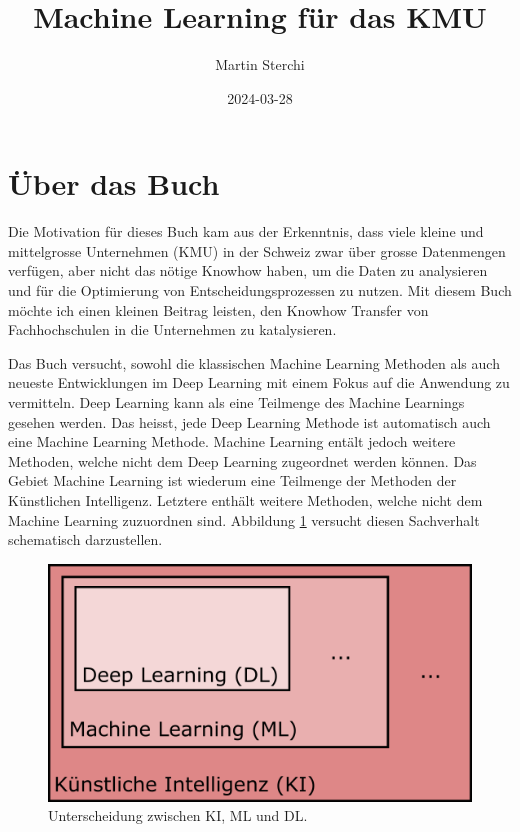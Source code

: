 \documentclass[
]{book}
\title{Machine Learning für das KMU}
\author{Martin Sterchi}
\date{2024-03-28}
\begin{document}
\maketitle

{
\setcounter{tocdepth}{1}
\tableofcontents
}
\hypertarget{uxfcber-das-buch}{%
\chapter*{Über das Buch}\label{uxfcber-das-buch}}

Die Motivation für dieses Buch kam aus der Erkenntnis, dass viele kleine und mittelgrosse Unternehmen (KMU) in der Schweiz zwar über grosse Datenmengen verfügen, aber nicht das nötige Knowhow haben, um die Daten zu analysieren und für die Optimierung von Entscheidungsprozessen zu nutzen. Mit diesem Buch möchte ich einen kleinen Beitrag leisten, den Knowhow Transfer von Fachhochschulen in die Unternehmen zu katalysieren.

Das Buch versucht, sowohl die klassischen Machine Learning Methoden als auch neueste Entwicklungen im Deep Learning mit einem Fokus auf die Anwendung zu vermitteln. Deep Learning kann als eine Teilmenge des Machine Learnings gesehen werden. Das heisst, jede Deep Learning Methode ist automatisch auch eine Machine Learning Methode. Machine Learning entält jedoch weitere Methoden, welche nicht dem Deep Learning zugeordnet werden können. Das Gebiet Machine Learning ist wiederum eine Teilmenge der Methoden der Künstlichen Intelligenz. Letztere enthält weitere Methoden, welche nicht dem Machine Learning zuzuordnen sind. Abbildung \ref{fig:kimldl} versucht diesen Sachverhalt schematisch darzustellen.

\begin{figure}

{\centering \includegraphics[width=0.6\linewidth]{images/KI_ML_DL} 

}

\caption{Unterscheidung zwischen KI, ML und DL. }\label{fig:kimldl}
\end{figure}
\end{document}

